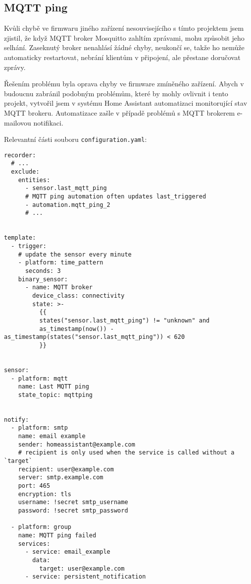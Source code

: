 \subsection{MQTT ping}  %
Kvůli chybě ve firmwaru jiného zařízení nesouvisejícího s tímto projektem jsem
zjistil, že když MQTT broker Mosquitto zahltím zprávami, mohu způsobit jeho
selhání. Zaseknutý broker nenahlásí žádné chyby, neukončí se, takže ho
 nemůže automaticky restartovat, nebrání klientům
v připojení, ale přestane doručovat zprávy.

Řešením problému byla oprava chyby ve firmware zmíněného zařízení. Abych
v budoucnu zabránil podobným problémům, které by mohly ovlivnit i tento
projekt, vytvořil jsem v systému Home Assistant automatizaci monitorující stav
MQTT brokeru. Automatizace zašle v případě problémů s MQTT brokerem e-mailovou
notifikaci.

Relevantní části souboru \texttt{configuration.yaml}:
\begin{lstlisting}
recorder:
  # ...
  exclude:
    entities:
      - sensor.last_mqtt_ping
      # MQTT ping automation often updates last_triggered
      - automation.mqtt_ping_2
      # ...


template:
  - trigger:
    # update the sensor every minute
    - platform: time_pattern
      seconds: 3
    binary_sensor:
      - name: MQTT broker
        device_class: connectivity
        state: >-
          {{
          states("sensor.last_mqtt_ping") != "unknown" and
          as_timestamp(now()) - as_timestamp(states("sensor.last_mqtt_ping")) < 620
          }}


sensor:
  - platform: mqtt
    name: Last MQTT ping
    state_topic: mqttping


notify:
  - platform: smtp
    name: email example
    sender: homeassistant@example.com
    # recipient is only used when the service is called without a `target`
    recipient: user@example.com
    server: smtp.example.com
    port: 465
    encryption: tls
    username: !secret smtp_username
    password: !secret smtp_password

  - platform: group
    name: MQTT ping failed
    services:
      - service: email_example
        data:
          target: user@example.com
      - service: persistent_notification
\end{lstlisting}


